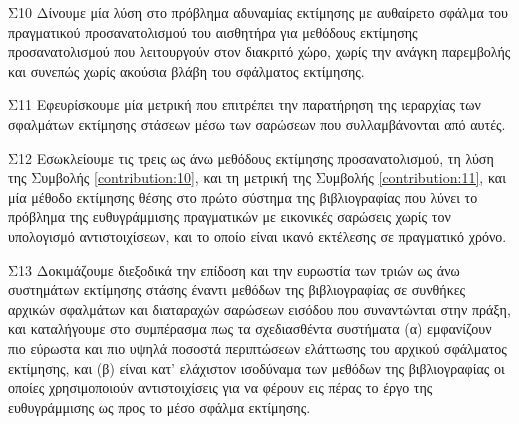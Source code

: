 \begin{bw_box}
\begin{customcontribution}{Σ10}
  \label{contribution:10}
  Δίνουμε μία λύση στο πρόβλημα αδυναμίας εκτίμησης με αυθαίρετο σφάλμα του
  πραγματικού προσανατολισμού του αισθητήρα για μεθόδους εκτίμησης
  προσανατολισμού που λειτουργούν στον διακριτό χώρο, χωρίς την ανάγκη
  παρεμβολής και συνεπώς χωρίς ακούσια βλάβη του σφάλματος εκτίμησης.
\end{customcontribution}
\end{bw_box}

\begin{bw_box}
\begin{customcontribution}{Σ11}
  \label{contribution:11}
  Εφευρίσκουμε μία μετρική που επιτρέπει την παρατήρηση της ιεραρχίας των
  σφαλμάτων εκτίμησης στάσεων μέσω των σαρώσεων που συλλαμβάνονται από αυτές.
\end{customcontribution}
\end{bw_box}

\begin{bw_box}
\begin{customcontribution}{Σ12}
  \label{contribution:12}
  Εσωκλείουμε τις τρεις ως άνω μεθόδους εκτίμησης προσανατολισμού, τη λύση της
  Συμβολής \ref{contribution:10}, και τη μετρική της Συμβολής
  \ref{contribution:11}, και μία μέθοδο εκτίμησης θέσης στο πρώτο σύστημα της
  βιβλιογραφίας που λύνει το πρόβλημα της ευθυγράμμισης πραγματικών με
  εικονικές σαρώσεις χωρίς τον υπολογισμό αντιστοιχίσεων, και το οποίο είναι
  ικανό εκτέλεσης σε πραγματικό χρόνο.
\end{customcontribution}
\end{bw_box}

\begin{bw_box}
\begin{customcontribution}{Σ13}
  \label{contribution:13}
  Δοκιμάζουμε διεξοδικά την επίδοση και την ευρωστία των τριών ως άνω
  συστημάτων εκτίμησης στάσης έναντι μεθόδων της βιβλιογραφίας σε συνθήκες
  αρχικών σφαλμάτων και διαταραχών σαρώσεων εισόδου που συναντώνται στην πράξη,
  και καταλήγουμε στο συμπέρασμα πως τα σχεδιασθέντα συστήματα (α) εμφανίζουν
  πιο εύρωστα και πιο υψηλά ποσοστά περιπτώσεων ελάττωσης του αρχικού σφάλματος
  εκτίμησης, και (β) είναι κατ' ελάχιστον ισοδύναμα των μεθόδων της
  βιβλιογραφίας οι οποίες χρησιμοποιούν αντιστοιχίσεις για να φέρουν εις πέρας
  το έργο της ευθυγράμμισης ως προς το μέσο σφάλμα εκτίμησης.
\end{customcontribution}
\end{bw_box}
\vspace{1cm}



